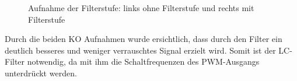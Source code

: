 \begin{figure}[htbp]
	\centering
	\quad
	\quad
	\caption[Aufnahme der Filterstufe mit 500Hz Sinus-Signal]{Aufnahme der Filterstufe: links ohne Filterstufe und rechts mit Filterstufe}
	\label{fig:filterVal}
\end{figure}

Durch die beiden KO Aufnahmen wurde ersichtlich, dass durch den Filter ein deutlich besseres und weniger verrauschtes Signal erzielt wird. Somit ist der LC-Filter notwendig, da mit ihm die Schaltfrequenzen des PWM-Ausgangs unterdrückt werden.
